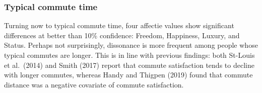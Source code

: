 \documentclass[]{elsarticle} %
\begin{document}
\hypertarget{typical-commute-time}{%
\subsubsection{Typical commute time}\label{typical-commute-time}}

Turning now to typical commute time, four affectie values show
significant differences at better than 10\% confidence: Freedom,
Happiness, Luxury, and Status. Perhaps not surprisingly, dissonance is
more frequent among people whose typical commutes are longer. This is in
line with previous findings: both St-Louis et al.~(2014) and Smith
(2017) report that commute satisfaction tends to decline with longer
commutes, whereas Handy and Thigpen (2019) found that commute distance
was a negative covariate of commute satisfaction.
\end{document}
